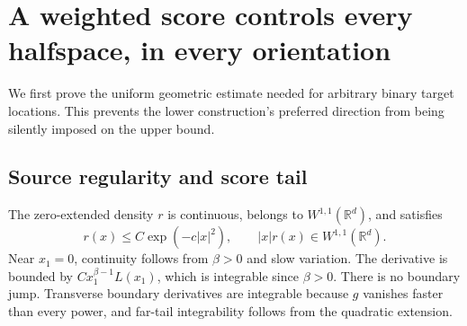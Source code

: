 \section{A weighted score controls every halfspace, in every orientation}

We first prove the uniform geometric estimate needed for arbitrary binary target locations. This prevents the lower construction's preferred direction from being silently imposed on the upper bound.

\subsection{Source regularity and score tail}

The zero-extended density $r$ is continuous, belongs to $W^{1,1}(\mathbb R^d)$, and satisfies
\[
  r(x)\le C\exp(-c|x|^2),
  \qquad |x|r(x)\in W^{1,1}(\mathbb R^d).
\]
Near $x_1=0$, continuity follows from $\beta>0$ and slow variation. The derivative is bounded by $C x_1^{\beta-1}L(x_1)$, which is integrable since $\beta>0$. There is no boundary jump. Transverse boundary derivatives are integrable because $g$ vanishes faster than every power, and far-tail integrability follows from the quadratic extension.

